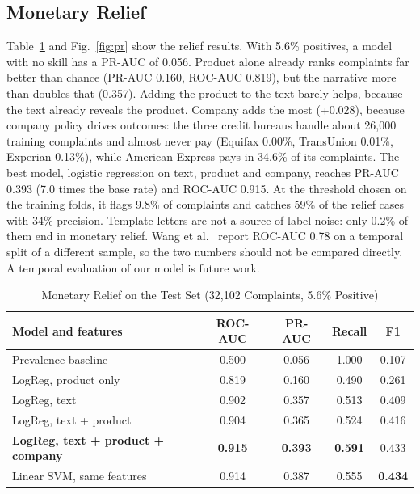 \documentclass[conference]{IEEEtran}
\begin{document}
\subsection{Monetary Relief}
Table~\ref{tab:relief} and Fig.~\ref{fig:pr} show the relief results. With 5.6\% positives, a model with no skill has a PR-AUC of 0.056. Product alone already ranks complaints far better than chance (PR-AUC 0.160, ROC-AUC 0.819), but the narrative more than doubles that (0.357). Adding the product to the text barely helps, because the text already reveals the product. Company adds the most (+0.028), because company policy drives outcomes: the three credit bureaus handle about 26,000 training complaints and almost never pay (Equifax 0.00\%, TransUnion 0.01\%, Experian 0.13\%), while American Express pays in 34.6\% of its complaints. The best model, logistic regression on text, product and company, reaches PR-AUC 0.393 (7.0 times the base rate) and ROC-AUC 0.915. At the threshold chosen on the training folds, it flags 9.8\% of complaints and catches 59\% of the relief cases with 34\% precision. Template letters are not a source of label noise: only 0.2\% of them end in monetary relief. Wang et al.~\cite{wang} report ROC-AUC 0.78 on a temporal split of a different sample, so the two numbers should not be compared directly. A temporal evaluation of our model is future work.

\begin{table}[!t]
\caption{Monetary Relief on the Test Set (32,102 Complaints, 5.6\% Positive)}
\label{tab:relief}
\centering
\footnotesize
\setlength{\tabcolsep}{3.5pt}
\begin{tabular}{@{}lcccc@{}}
\toprule
Model and features & ROC-AUC & PR-AUC & Recall & F1 \\
\midrule
Prevalence baseline & 0.500 & 0.056 & 1.000 & 0.107 \\
LogReg, product only & 0.819 & 0.160 & 0.490 & 0.261 \\
LogReg, text & 0.902 & 0.357 & 0.513 & 0.409 \\
LogReg, text + product & 0.904 & 0.365 & 0.524 & 0.416 \\
\textbf{LogReg, text + product + company} & \textbf{0.915} & \textbf{0.393} & \textbf{0.591} & 0.433 \\
Linear SVM, same features & 0.914 & 0.387 & 0.555 & \textbf{0.434} \\
\bottomrule
\end{tabular}
\end{table}
\end{document}
